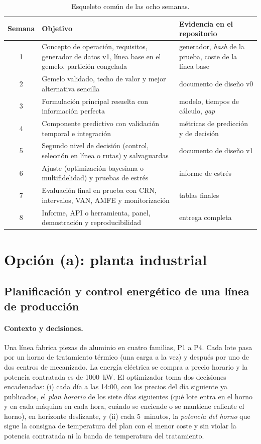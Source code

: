 \begin{table}[H]
\centering\small
\caption{Esqueleto común de las ocho semanas.}\label{tab:calendario}
\begin{tabularx}{\textwidth}{@{}c>{\raggedright\arraybackslash}X>{\raggedright\arraybackslash}p{4.6cm}@{}}
\toprule
Semana & Objetivo & Evidencia en el repositorio \\
\midrule
1 & Concepto de operación, requisitos, generador de datos v1, línea base en el gemelo, partición congelada & generador, \emph{hash} de la prueba, coste de la línea base \\
2 & Gemelo validado, techo de valor y mejor alternativa sencilla & documento de diseño v0 \\
3 & Formulación principal resuelta con información perfecta & modelo, tiempos de cálculo, \emph{gap} \\
4 & Componente predictivo con validación temporal e integración & métricas de predicción y de decisión \\
5 & Segundo nivel de decisión (control, selección en línea o rutas) y salvaguardas & documento de diseño v1 \\
6 & Ajuste (optimización bayesiana o multifidelidad) y pruebas de estrés & informe de estrés \\
7 & Evaluación final en prueba con CRN, intervalos, VAN, AMFE y monitorización & tablas finales \\
8 & Informe, API o herramienta, panel, demostración y reproducibilidad & entrega completa \\
\bottomrule
\end{tabularx}
\end{table}

\section{Opción (a): planta industrial}
\label{sec:proy-a}

\subsection*{Planificación y control energético de una línea de producción}

\paragraph{Contexto y decisiones.} Una línea fabrica piezas de aluminio en cuatro familias, P1 a P4. Cada lote pasa por un horno de tratamiento térmico (una carga a la vez) y después por uno de dos centros de mecanizado. La energía eléctrica se compra a precio horario y la potencia contratada es de 1000~kW. El optimizador toma dos decisiones encadenadas: (i) cada día a las 14:00, con los precios del día siguiente ya publicados, el \emph{plan horario} de los siete días siguientes (qué lote entra en el horno y en cada máquina en cada hora, cuándo se enciende o se mantiene caliente el horno), en horizonte deslizante, y (ii) cada 5~minutos, la \emph{potencia del horno} que sigue la consigna de temperatura del plan con el menor coste y sin violar la potencia contratada ni la banda de temperatura del tratamiento.

